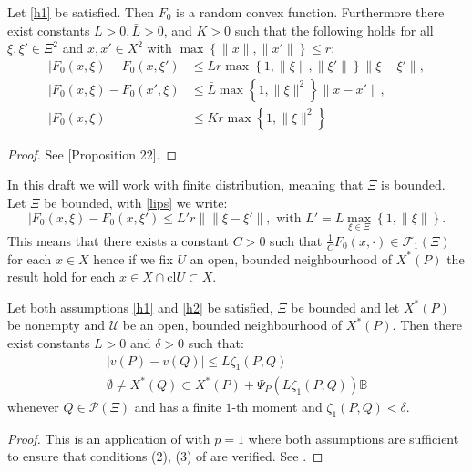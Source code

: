 \documentclass{amsart}
\begin{document}
\begin{proposition}
    Let \cref{h1} be satisfied. Then $F_0$ is a random convex function. Furthermore there exist constants $L>0, \bar{L}>0$, and $K>0$ such that the following holds for all $\xi,\xi'\in\Xi^2$ and $x,x'\in X^2$ with $\max\left\{\lVert x\rVert, \lVert x' \rVert\right\}\leq r$:
    \begin{align}
        \lvert F_0\left(x,\xi\right)- F_0\left(x,\xi'\right) &\leq Lr\max\left\{1,\lVert \xi\rVert, \lVert \xi'\rVert\right\}\lVert \xi-\xi'\rVert, \label{lips}\\
        \lvert F_0\left(x,\xi\right)- F_0\left(x',\xi\right) &\leq \bar{L}\max\left\{1,\lVert\xi\rVert^2\right\}\lVert x-x'\rVert, \\
        \lvert F_0\left(x,\xi\right) &\leq Kr\max\left\{1,\lVert\xi\rVert^2\right\}
    \end{align}
\end{proposition}
\begin{proof}
    See \cite{romisch_stability_2003}[Proposition 22].
\end{proof}
In this draft we will work with finite distribution, meaning that $\Xi$ is bounded. Let $\Xi$ be bounded, with \eqref{lips} we write:
$$
\lvert F_0\left(x,\xi\right)- F_0\left(x,\xi'\right) \leq L'r \lVert \lVert \xi-\xi'\rVert, \text{ with } L'=L\max_{\xi\in\Xi}\left\{1,\lVert\xi\rVert\right\}.
$$
This means that there exists a constant $C>0$ such that $\frac{1}{C}F_0\left(x,\cdot\right)\in\mathcal{F}_1\left(\Xi\right)$ for each $x\in X$ hence if we fix $U$ an open, bounded neighbourhood of $X^*\left(P\right)$ the result hold for each $x\in X\cap \text{cl}U\subset X$. 
\begin{corollary}
    Let both assumptions \cref{h1} and \cref{h2} be satisfied, $\Xi$ be bounded and let $X^*\left(P\right)$ be nonempty and $\mathcal{U}$ be an open, bounded neighbourhood of $X^*\left(P\right).$ Then there exist constants $L>0$ and $\delta >0$ such that:
    \begin{align*}
        \lvert v\left(P\right)-v\left(Q\right)\rvert \leq L\zeta_1\left(P,Q\right) \\
        \emptyset \ne X^*\left(Q\right)\subset X^*\left(P\right)+\Psi_P\left(L\zeta_1\left(P,Q\right)\right)\mathbb{B}
    \end{align*}
    whenever $Q\in\mathcal{P}\left(\Xi\right)$ and has a finite $1$-th moment and $\zeta_1\left(P,Q\right)<\delta$.
\end{corollary}
\begin{proof}
    This is an application of  with $p=1$ where both assumptions are sufficient to ensure that conditions (2), (3) of  are verified. See \cite[Proposition 22]{romisch_stability_2003}.
\end{proof}
\end{document}

